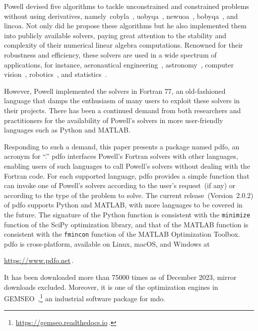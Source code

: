 \documentclass[smallextended,final]{svjour3}
\newcommand{\modified}[1]{\texorpdfstring{{\color{RoyalBlue}#1}}{#1}}
\begin{document}
Powell devised five algorithms to tackle unconstrained and constrained problems without using derivatives, namely~\gls{cobyla}~\cite{Powell_1994}, \gls{uobyqa}~\cite{Powell_2002}, \gls{newuoa}~\cite{Powell_2006}, \gls{bobyqa}~\cite{Powell_2009}, and \gls{lincoa}.
\modified{Not only did he} propose these algorithms but \modified{he} also implemented them into publicly available solvers, paying great attention to the stability and complexity of their numerical linear algebra computations.
Renowned for their robustness and efficiency, these solvers are used in a wide spectrum of applications, for instance, aeronautical engineering~\cite{Gallard_Etal_2018}, astronomy~\cite{Mamon_Biviano_Boue_2013}, computer vision~\cite{Izadinia_Shan_Seitz_2017}, robotics~\cite{Mombaur_Truong_Laumond_2010}, and statistics~\cite{Bates_Etal_2015}.

However, Powell \modified{implemented} the solvers in Fortran 77, an \modified{old-fashioned} language that damps the enthusiasm of many users to exploit these solvers in their projects.
There has been a continued demand from both researchers and practitioners for the availability of Powell's solvers in more user-friendly languages such as Python and MATLAB.

Responding to such a demand, this paper presents a package named \gls{pdfo}, an acronym for ``.''
\Gls{pdfo} interfaces Powell's Fortran solvers with other languages, enabling users of such languages to call Powell's solvers without dealing with the Fortran code.
For each supported language, \gls{pdfo} provides a simple function that can invoke one of Powell's solvers according to the user's request~(if any) or according to the type of the problem to solve.
The current release~(Version~\modified{2.0.2}) of \gls{pdfo} supports Python and MATLAB, with more languages to be covered in the future.
The signature of the Python function is consistent with the \texttt{minimize} function of the SciPy optimization library, and that of the MATLAB function is consistent with the \texttt{fmincon} function of the MATLAB Optimization Toolbox.
\Gls{pdfo} is cross-platform, available on Linux, macOS, and Windows at
\begin{center}
    \url{https://www.pdfo.net}\,.
\end{center}
It has been downloaded more than \modified{\num{75000}} times as of \modified{December} 2023, mirror downloads excluded.
Moreover, it is one of the optimization engines in GEMSEO~\cite{Gallard_Etal_2018},\footnote{\url{https://gemseo.readthedocs.io}\,.} an industrial software package for \gls{mdo}.
\end{document}
